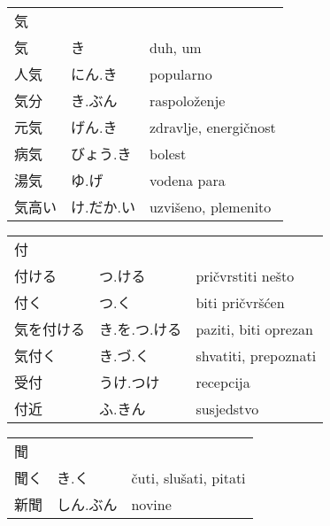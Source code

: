 

\newenvironment{dictentry}[1]{
	\begin{tabular}{p{2cm} p{3cm} p{10cm}}
		#1 &&\\
}{
	\end{tabular}
	\vspace{20pt}
}

\newcommand{\example}[3]{
	\hspace*{\fill}#1 & #2 & #3\\
}

\author{ロボット君}


\begin{dictentry}{気}
\example{気}{き}{duh, um}
\example{人気}{にん.き}{popularno}
\example{気分}{き.ぶん}{raspoloženje}
\example{元気}{げん.き}{zdravlje, energičnost}
\example{病気}{びょう.き}{bolest}
\example{湯気}{ゆ.げ}{vodena para}
\example{気高い}{け.だか.い}{uzvišeno, plemenito}
\end{dictentry}

\begin{dictentry}{付}
\example{付ける}{つ.ける}{pričvrstiti nešto}
\example{付く}{つ.く}{biti pričvršćen}
\example{気を付ける}{き.を.つ.ける}{paziti, biti oprezan}
\example{気付く}{き.づ.く}{shvatiti, prepoznati}
\example{受付}{うけ.つけ}{recepcija}
\example{付近}{ふ.きん}{susjedstvo}
\end{dictentry}

\begin{dictentry}{聞}
\example{聞く}{き.く}{čuti, slušati, pitati}
\example{新聞}{しん.ぶん}{novine}
\end{dictentry}

